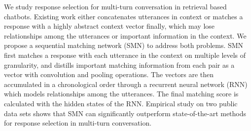 We study response selection for multi-turn conversation in retrieval based chatbots. Existing work either concatenates utterances in context or matches a response with a highly abstract context vector finally, which may lose relationships among the utterances or important information in the context. We propose a sequential matching network (SMN) to address both problems. SMN first matches a response with each utterance in the context on multiple levels of granularity, and distills important matching information from each pair as a vector with convolution and pooling operations. The vectors are then accumulated in a chronological order through a recurrent neural network (RNN) which models relationships among the utterances. The final matching score is calculated with the hidden states of the RNN. Empirical study on two public data sets shows that SMN can significantly outperform state-of-the-art methods for response selection in multi-turn conversation.
